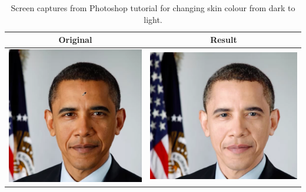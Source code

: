 \begin{longtable}{|c|c|}
    \caption{Screen captures from Photoshop tutorial for changing skin colour from dark to light. \label{tab:obama_demo}}\\
    \hline
    Original & Result \\
    \hline
  \begin{minipage}{.29\textwidth}
    \includegraphics[width=\textwidth,height=\textheight,keepaspectratio]{images/obama_orig}
  \end{minipage} & 
  \begin{minipage}{.29\textwidth}
    \includegraphics[width=\textwidth,height=\textheight,keepaspectratio]{images/obama_res}
  \end{minipage} \\
    \hline
\end{longtable}

